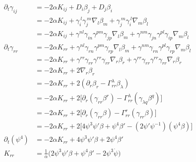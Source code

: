 \documentclass[12pt]{article}
\numberwithin{equation}{section}
\begin{document}
\begin{equation}
\begin{aligned}
\partial_t \gamma_{ij} &= -2 \alpha K_{ij} + D_i \beta_j + D_j \beta_i \\
&= -2 \alpha K_{ij} + \gamma_{i}^{~l} \gamma_{j}^{~m} \nabla_l \beta_m + \gamma_j^{~m} \gamma_i^{~l} \nabla_m \beta_l \\
&= -2 \alpha K_{ij} + \gamma^{n l} \gamma_{i n} \gamma^{p m} \gamma_{j p} \nabla_l \beta_m + \gamma^{n m} \gamma_{j n} \gamma^{p l} \gamma_{i p} \nabla_m \beta_l \\
\partial_t \gamma_{r r} &= -2 \alpha K_{rr} + \gamma^{n l} \gamma_{r n} \gamma^{p m} \gamma_{r p} \nabla_l \beta_m + \gamma^{n m} \gamma_{r n} \gamma^{p l} \gamma_{r p} \nabla_m \beta_l \\
&= -2 \alpha K_{rr} + \gamma^{r r} \gamma_{r r} \gamma^{r r} \gamma_{r r} \nabla_r \beta_r + \gamma^{r r} \gamma_{r r} \gamma^{r r} \gamma_{r r} \nabla_r \beta_r \\
&= -2 \alpha K_{rr} + 2 \nabla_r \beta_r \\
&= -2 \alpha K_{rr} + 2 (\partial_r \beta_r - \Gamma^{\lambda}_{rr} \beta_\lambda) \\
&= -2 \alpha K_{rr} + 2 \Big[ \partial_r (\gamma_{rr} \beta^r) - \Gamma^{\lambda}_{rr} (\gamma_{\lambda q} \beta^{q}) \Big] \\
&= -2 \alpha K_{rr} + 2 \Big[ \partial_r (\gamma_{rr} \beta) - \Gamma^{r}_{rr} (\gamma_{r r} \beta) \Big] \\
&= -2 \alpha K_{rr} + 2 \Big[ 4 \psi^3 \psi' \beta + \psi^4 \beta' - (2\psi' \psi^{-1}) (\psi^4 \beta) \Big] \\
\partial_t (\psi^4) &= -2 \alpha K_{rr} + 4 \psi^3 \psi' \beta + 2 \psi^4 \beta' \\
K_{rr} &= \frac{1}{\alpha} \Big( 2 \psi^3 \psi' \beta + \psi^4 \beta' - 2 \psi^3 \dot{\psi} \Big) \\
\end{aligned}
\end{equation}
\end{document}
